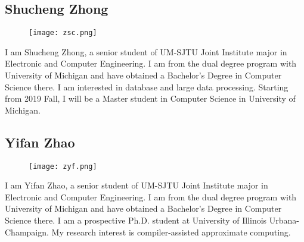 \subsection{Shucheng Zhong}
\begin{figure}[htbp]
  \centering \texttt{[image: zsc.png]}
  \label{fig:zsc}
\end{figure}
I am Shucheng Zhong, a senior student of UM-SJTU Joint Institute major in Electronic and Computer Engineering. I am from the dual degree program with University of Michigan and have obtained a Bachelor's Degree in Computer Science there. I am interested in database and large data processing. Starting from 2019 Fall, I will be a Master student in Computer Science in University of Michigan.

\newpage

\subsection{Yifan Zhao}
\begin{figure}[h]
  \centering \texttt{[image: zyf.png]}
  \label{fig:zyf}
\end{figure}
I am Yifan Zhao, a senior student of UM-SJTU Joint Institute major in Electronic and Computer Engineering. I am from the dual degree program with University of Michigan and have obtained a Bachelor's Degree in Computer Science there. I am a prospective Ph.D. student at University of Illinois Urbana-Champaign. My research interest is compiler-assisted approximate computing.
